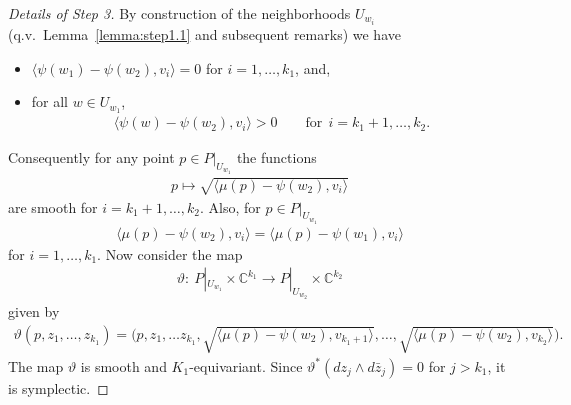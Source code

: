 \documentclass[pdftex]{sigma}
\numberwithin{equation}{section}
\begin{document}
\begin{proof}[Details of Step 3]
By construction of the neighborhoods $U_{w_i}$ (q.v.\
Lemma~\ref{lemma:step1.1} and subsequent remarks) we have
\begin{itemize}\itemsep=0pt
\item $\langle\psi(w_1)-\psi(w_2), v_i\rangle =0$ for $i=1,\ldots, k_1$, and,
\item for all $w\in U_{w_1}$,
\begin{gather*}
\langle \psi(w) - \psi(w_2), v_i\rangle>0 \qquad \textrm{for} \ \ i=k_1+1,\ldots, k_2.
\end{gather*}
\end{itemize}
Consequently  for any point $p\in P|_{U_{w_1}}$ the functions
\begin{gather*}
p\mapsto \sqrt{\langle \mu(p) - \psi(w_2),v_i \rangle}
\end{gather*}
are smooth for $i=k_1+1,\ldots, k_2$.  Also, for  $p\in P|_{U_{w_1}}$
\begin{gather*}
\langle \mu(p) - \psi(w_2),v_i \rangle = \langle \mu(p) - \psi(w_1),v_i \rangle
\end{gather*}
for $i=1,\ldots, k_1$.  Now consider the map
\begin{gather*}
\vartheta\colon \ P|_{U_{w_1}}\times {\mathbb C}^{k_1} \to P|_{U_{w_2}} \times {\mathbb C}^{k_2}
\end{gather*}
given by
\begin{gather*}
\vartheta(p,z_1,\ldots, z_{k_1}) = \Big(p,z_1,\ldots z_{k_1},
\sqrt{\langle   \mu(p) - \psi(w_2),v_{k_1+1} \rangle},\ldots ,
\sqrt{\langle \mu(p) -  \psi(w_2),v_{k_2} \rangle}\Big).
\end{gather*}
The map $\vartheta $ is smooth and $K_1$-equivariant.  Since
$\vartheta^*(dz_j\wedge d\bar{z}_j) = 0$ for $j>k_1$, it is symplectic.


\end{proof}
\end{document}
